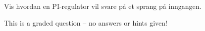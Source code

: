 

Vis hvordan en PI-regulator vil svare p{\aa} et sprang p{\aa} inngangen. 


\vskip 80pt




\vfil 

\eject






This is a graded question -- no answers or hints given!










